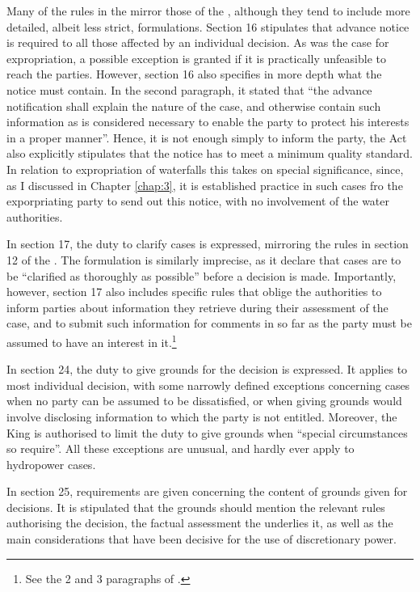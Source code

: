 Many of the rules in the \cite{paa67} mirror those of the \cite{ea59}, although they tend to include more detailed, albeit less strict, formulations. Section 16 stipulates that advance notice is required to all those affected by an individual decision. As was the case for expropriation, a possible exception is granted if it is practically unfeasible to reach the parties. However, section 16 also specifies in more depth what the notice must contain. In the second paragraph, it stated that ``the advance notification shall explain the nature of the case, and otherwise contain such information as is considered necessary to enable the party to protect his interests in a proper manner''. Hence, it is not enough simply to inform the party, the Act also explicitly stipulates that the notice has to meet a minimum quality standard. In relation to expropriation of waterfalls this takes on special significance, since, as I discussed in Chapter \ref{chap:3}, it is established practice in such cases fro the exporpriating party to send out this notice, with no involvement of the water authorities. 

In section 17, the duty to clarify cases is expressed, mirroring the rules in section 12 of the \cite{ea59}. The formulation is similarly imprecise, as it declare that cases are to be ``clarified as thoroughly as possible'' before a decision is made. Importantly, however, section 17 also includes specific rules that oblige the authorities to inform parties about information they retrieve during their assessment of the case, and to submit such information for comments in so far as the party must be assumed to have an interest in it.\footnote{See the 2 and 3 paragraphs of \cite[17]{paa67}.}

In section 24, the duty to give grounds for the decision is expressed. It applies to most individual decision, with some narrowly defined exceptions concerning cases when no party can be assumed to be dissatisfied, or when giving grounds would involve disclosing information to which the party is not entitled. Moreover, the King is authorised to limit the duty to give grounds when ``special circumstances so require''. All these exceptions are unusual, and hardly ever apply to hydropower cases.

In section 25, requirements are given concerning the content of grounds given for decisions. It is stipulated that the grounds should mention the relevant rules authorising the decision, the factual assessment the underlies it, as well as the main considerations that have been decisive for the use of discretionary power. 

